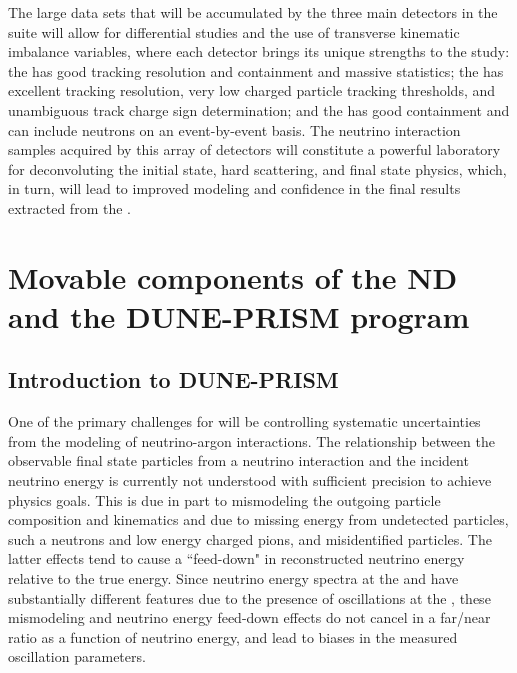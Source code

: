 The large data sets that will be accumulated by the three main detectors in the   suite will allow for differential studies and the use of transverse kinematic imbalance variables, where each detector brings its unique strengths to the study: the  has good tracking resolution and containment and massive statistics; the  has excellent tracking resolution, very low charged particle tracking thresholds, and unambiguous track charge sign determination; and the  has good containment and can include neutrons on an event-by-event basis. The neutrino interaction samples acquired by this array of detectors will constitute a powerful laboratory for deconvoluting the initial state, hard scattering, and final state physics, which, in turn, will lead to improved modeling and confidence in the final results extracted from the  .  




\section{Movable components of the ND and the DUNE-PRISM program}
\label{sec:appx-nd:nd-movable}

\subsection{Introduction to DUNE-PRISM}

One of the primary challenges for  will be controlling systematic uncertainties from the modeling of neutrino-argon interactions. The relationship between the observable final state particles from a neutrino interaction and the incident neutrino energy is currently not understood with sufficient precision to achieve  physics goals.  This is due in part to mismodeling the outgoing particle composition and kinematics and due to missing energy from undetected particles, such a neutrons and low energy charged pions, and misidentified particles. The latter effects tend to cause  a ``feed-down" in reconstructed neutrino energy relative to the true energy. Since neutrino energy spectra at the  and  have substantially different features due to the presence of oscillations at the  , these mismodeling and neutrino energy feed-down effects do not cancel in a far/near ratio as a function of neutrino energy, and lead to biases in the measured oscillation parameters.

